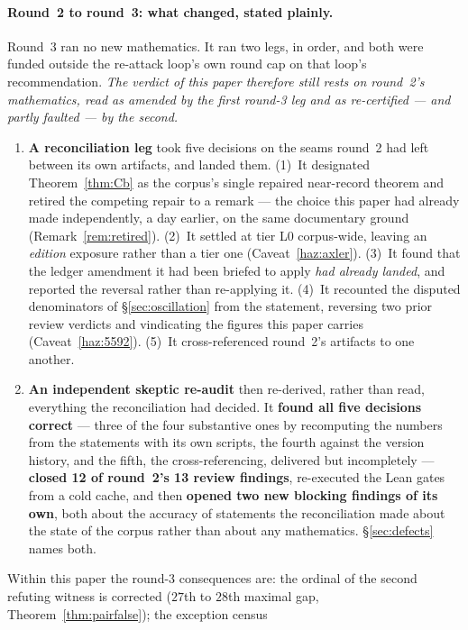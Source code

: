 \documentclass[11pt,a4paper]{article}
\theoremstyle{plain}
\theoremstyle{definition}
\theoremstyle{remark}
\begin{document}
\paragraph{Round~2 to round~3: what changed, stated plainly.} Round~3 ran no new mathematics.
It ran two legs, in order, and both were funded outside the re-attack loop's own round cap on
that loop's recommendation. \emph{The verdict of this paper therefore still rests on round~2's
mathematics, read as amended by the first round-3 leg and as re-certified --- and partly
faulted --- by the second.}
\begin{enumerate}
\item \textbf{A reconciliation leg} took five decisions on the seams round~2 had left between
  its own artifacts, and landed them. (1)~It designated Theorem~\ref{thm:Cb} as the corpus's
  single repaired near-record theorem and retired the competing repair to a remark --- the
  choice this paper had already made independently, a day earlier, on the same documentary
  ground (Remark~\ref{rem:retired}). (2)~It settled \cite{axler2014newbounds} at tier L0
  corpus-wide, leaving an \emph{edition} exposure rather than a tier one
  (Caveat~\ref{haz:axler}). (3)~It found that the ledger amendment it had been briefed to
  apply \emph{had already landed}, and reported the reversal rather than re-applying it.
  (4)~It recounted the disputed denominators of \S\ref{sec:oscillation} from the statement,
  reversing two prior review verdicts and vindicating the figures this paper carries
  (Caveat~\ref{haz:5592}). (5)~It cross-referenced round~2's artifacts to one another.
\item \textbf{An independent skeptic re-audit} then re-derived, rather than read, everything
  the reconciliation had decided. It \textbf{found all five decisions correct} --- three of the
  four substantive ones by recomputing the numbers from the statements with its own scripts,
  the fourth against the version history, and the fifth, the cross-referencing, delivered but
  incompletely --- \textbf{closed 12 of round~2's 13 review findings}, re-executed the Lean
  gates from a cold cache, and then \textbf{opened two new blocking findings of its own}, both
  about the accuracy of statements the reconciliation made about the state of the corpus rather
  than about any mathematics. \S\ref{sec:defects} names both.
\end{enumerate}
Within this paper the round-3 consequences are: the ordinal of the second refuting witness is
corrected ($27$th to $28$th maximal gap, Theorem~\ref{thm:pairfalse}); the exception census
\end{document}
